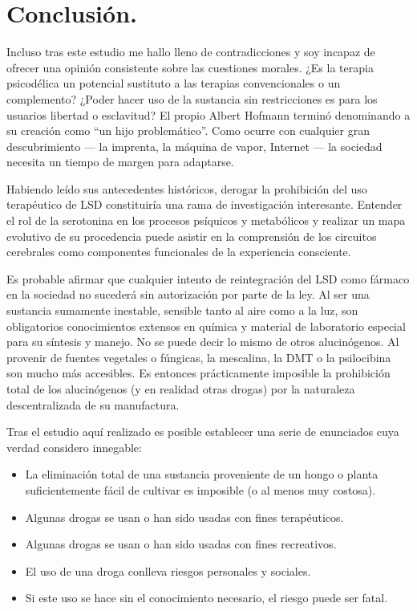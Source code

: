 \section{Conclusión.}

Incluso tras este estudio me hallo lleno de contradicciones y soy incapaz de ofrecer una opinión consistente sobre las cuestiones morales. ¿Es la terapia psicodélica un potencial sustituto a las terapias convencionales o un complemento? ¿Poder hacer uso de la sustancia sin restricciones es para los usuarios libertad o esclavitud? El propio Albert Hofmann terminó denominando a su creación como \enquote{un hijo problemático}. Como ocurre con cualquier gran descubrimiento --- la imprenta, la máquina de vapor, Internet --- la sociedad necesita un tiempo de margen para adaptarse.

Habiendo leído sus antecedentes históricos, derogar la prohibición del uso terapéutico de LSD constituiría una rama de investigación interesante. Entender el rol de la serotonina en los procesos psíquicos y metabólicos y realizar un mapa evolutivo de su procedencia puede asistir en la comprensión de los circuitos cerebrales como componentes funcionales de la experiencia consciente.

Es probable afirmar que cualquier intento de reintegración del LSD como fármaco en la sociedad no sucederá sin autorización por parte de la ley. Al ser una sustancia sumamente inestable, sensible tanto al aire como a la luz, son obligatorios conocimientos extensos en química y material de laboratorio especial para su síntesis y manejo. No se puede decir lo mismo de otros alucinógenos. Al provenir de fuentes vegetales o fúngicas, la mescalina, la DMT o la psilocibina son mucho más accesibles. Es entonces prácticamente imposible la prohibición total de los alucinógenos (y en realidad otras drogas) por la naturaleza descentralizada de su manufactura.

Tras el estudio aquí realizado es posible establecer una serie de enunciados cuya verdad considero innegable:

\begin{itemize}
	\item La eliminación total de una sustancia proveniente de un hongo o planta suficientemente fácil de cultivar es imposible (o al menos muy costosa).
	\item Algunas drogas se usan o han sido usadas con fines terapéuticos.
	\item Algunas drogas se usan o han sido usadas con fines recreativos.
	\item El uso de una droga conlleva riesgos personales y sociales.
	\item Si este uso se hace sin el conocimiento necesario, el riesgo puede ser fatal.
\end{itemize}

